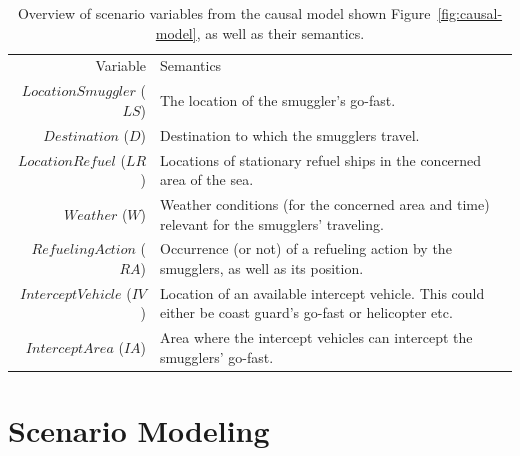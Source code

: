 \documentclass[conference]{IEEEtran}
\begin{document}
\begin{table}[!ht]
 \centering
 \caption{Overview of scenario variables from the causal model shown Figure~\ref{fig:causal-model}, as well as their semantics.}
 \begin{tabular}[!ht]{rp{5cm}}
\toprule
 Variable & Semantics \\
\cmidrule(r){1-1}
\cmidrule(l){2-2}
$LocationSmuggler$ ($LS$) &
The location of the smuggler's go-fast. \\
$Destination$ ($D$) &
Destination to which the smugglers travel. \\
$LocationRefuel$ ($LR$) &
Locations of stationary refuel ships in the concerned area of the sea. \\
$Weather$ ($W$) &
Weather conditions (for the concerned area and time) relevant for the smugglers' traveling. \\
$RefuelingAction$ ($RA$) &
Occurrence (or not) of a refueling action by the smugglers, as well as its position. \\
$InterceptVehicle$ ($IV$) &
Location of an available intercept vehicle. This could either be coast guard's go-fast or helicopter etc. \\
$InterceptArea$ ($IA$) &
Area where the intercept vehicles can intercept the smugglers' go-fast. \\
\bottomrule
\end{tabular}
\label{tab:scenario-variables}
\end{table}





\section{Scenario Modeling}
\label{sec:influence-diagrams}
\end{document}
